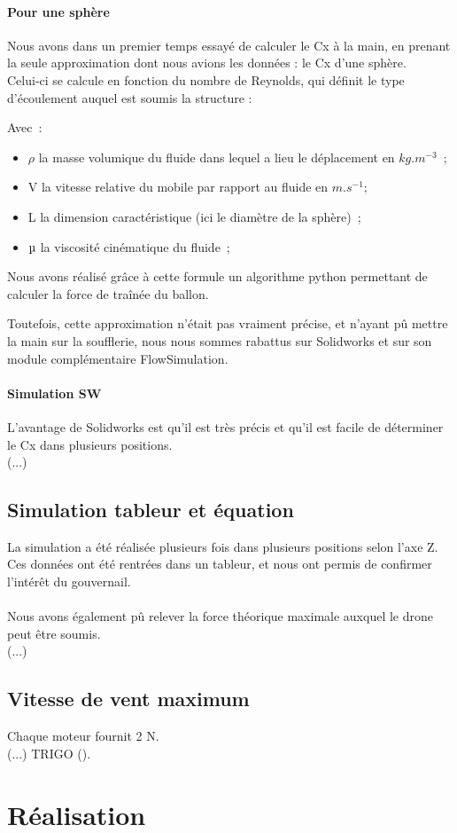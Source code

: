 \documentclass[a4paper,11pt]{article}
\begin{document}
\paragraph{Pour une sphère}
	Nous avons dans un premier temps essayé de calculer le Cx à la main, en prenant la seule approximation dont nous avions les données : le Cx d'une sphère.\\
	Celui-ci se calcule en fonction du nombre de Reynolds, qui définit le type d'écoulement auquel est soumis la structure :
	\begin{center}
  \end{center}
	Avec~:
  \begin{itemize}
	 \item $\rho$ la masse volumique du fluide dans lequel a lieu le déplacement en $kg.m^{-3}$~;
   \item V la vitesse relative du mobile par rapport au fluide en $m.s^{-1}$;
   \item L la dimension caractéristique (ici le diamètre de la sphère)~;
   \item $\micro$ la viscosité cinématique du fluide~;
  \end{itemize}
	Nous avons réalisé grâce à cette formule un algorithme python permettant de calculer la force de traînée du ballon.\\

	

	Toutefois, cette approximation n'était pas vraiment précise, et n'ayant pû mettre la main sur la soufflerie, nous nous sommes rabattus sur Solidworks et sur son module complémentaire FlowSimulation.
\paragraph{Simulation SW}
	L'avantage de Solidworks est qu'il est très précis et qu'il est facile de déterminer le Cx dans plusieurs positions.\\
	(...)
\subsection{Simulation tableur et équation}
	La simulation a été réalisée plusieurs fois dans plusieurs positions selon l'axe Z.\\
	Ces données ont été rentrées dans un tableur, et nous ont permis de confirmer l'intérêt du gouvernail.\\
	\\
	Nous avons également pû relever la force théorique maximale auxquel le drone peut être soumis.\\
	(...)
\subsection{Vitesse de vent maximum}
	Chaque moteur fournit 2 N.\\
	(...) TRIGO ().
\section{Réalisation}
\end{document}
